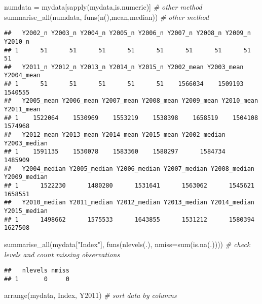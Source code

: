 \documentclass[
]{article}
\newenvironment{Shaded}{\begin{snugshade}}{\end{snugshade}}
\newcommand{\AttributeTok}[1]{\textcolor[rgb]{0.77,0.63,0.00}{#1}}
\newcommand{\CommentTok}[1]{\textcolor[rgb]{0.56,0.35,0.01}{\textit{#1}}}
\newcommand{\FunctionTok}[1]{\textcolor[rgb]{0.00,0.00,0.00}{#1}}
\newcommand{\NormalTok}[1]{#1}
\newcommand{\OtherTok}[1]{\textcolor[rgb]{0.56,0.35,0.01}{#1}}
\newcommand{\StringTok}[1]{\textcolor[rgb]{0.31,0.60,0.02}{#1}}
\begin{document}
\begin{Shaded}
\begin{Highlighting}[]
\NormalTok{numdata }\OtherTok{=}\NormalTok{ mydata[}\FunctionTok{sapply}\NormalTok{(mydata,is.numeric)] }\CommentTok{\# other method}
\FunctionTok{summarise\_all}\NormalTok{(numdata, }\FunctionTok{funs}\NormalTok{(}\FunctionTok{n}\NormalTok{(),mean,median)) }\CommentTok{\# other method}
\end{Highlighting}
\end{Shaded}

\begin{verbatim}
##   Y2002_n Y2003_n Y2004_n Y2005_n Y2006_n Y2007_n Y2008_n Y2009_n Y2010_n
## 1      51      51      51      51      51      51      51      51      51
##   Y2011_n Y2012_n Y2013_n Y2014_n Y2015_n Y2002_mean Y2003_mean Y2004_mean
## 1      51      51      51      51      51    1566034    1509193    1540555
##   Y2005_mean Y2006_mean Y2007_mean Y2008_mean Y2009_mean Y2010_mean Y2011_mean
## 1    1522064    1530969    1553219    1538398    1658519    1504108    1574968
##   Y2012_mean Y2013_mean Y2014_mean Y2015_mean Y2002_median Y2003_median
## 1    1591135    1530078    1583360    1588297      1584734      1485909
##   Y2004_median Y2005_median Y2006_median Y2007_median Y2008_median Y2009_median
## 1      1522230      1480280      1531641      1563062      1545621      1658551
##   Y2010_median Y2011_median Y2012_median Y2013_median Y2014_median Y2015_median
## 1      1498662      1575533      1643855      1531212      1580394      1627508
\end{verbatim}

\begin{Shaded}
\begin{Highlighting}[]
\FunctionTok{summarise\_all}\NormalTok{(mydata[}\StringTok{"Index"}\NormalTok{], }\FunctionTok{funs}\NormalTok{(}\FunctionTok{nlevels}\NormalTok{(.), }\AttributeTok{nmiss=}\FunctionTok{sum}\NormalTok{(}\FunctionTok{is.na}\NormalTok{(.)))) }\CommentTok{\# check levels and count missing observations}
\end{Highlighting}
\end{Shaded}

\begin{verbatim}
##   nlevels nmiss
## 1       0     0
\end{verbatim}

\begin{Shaded}
\begin{Highlighting}[]
\FunctionTok{arrange}\NormalTok{(mydata, Index, Y2011) }\CommentTok{\# sort data by columns}
\end{Highlighting}
\end{Shaded}
\end{document}
